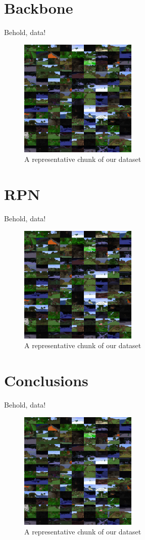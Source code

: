 \documentclass[english]{beamer}
\begin{document}
\section{Backbone}
\begin{frame}{Behold, data!}
  \begin{figure}[h]
      \centering
      \includegraphics[width=0.5\textwidth]{../images/dtset_repr.png}
      \caption{A representative chunk of our dataset}
  \end{figure}
\end{frame}

\section{RPN}
\begin{frame}{Behold, data!}
  \begin{figure}[h]
      \centering
      \includegraphics[width=0.5\textwidth]{../images/dtset_repr.png}
      \caption{A representative chunk of our dataset}
  \end{figure}
\end{frame}

\section{Conclusions}
\begin{frame}{Behold, data!}
  \begin{figure}[h]
      \centering
      \includegraphics[width=0.5\textwidth]{../images/dtset_repr.png}
      \caption{A representative chunk of our dataset}
  \end{figure}
\end{frame}
\end{document}
